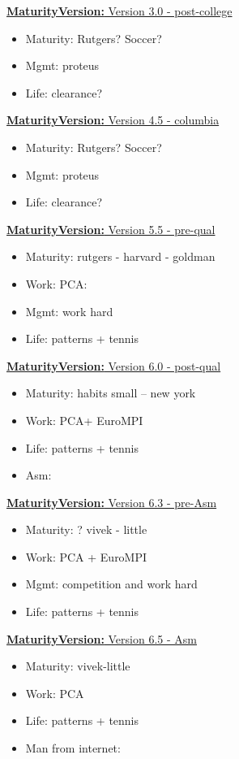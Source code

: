 \documentclass[11pt]{article}
\newcommand{\newMaturityVersion}[1]{\underline{\textbf{MaturityVersion:} #1} }
\begin{document}
\newMaturityVersion{Version 3.0 - post-college}
\begin{itemize} 
\item Maturity: Rutgers?  Soccer? 
\item Mgmt: proteus 
\item Life: clearance? 
\end{itemize} 

\newMaturityVersion{Version 4.5 - columbia} 
\begin{itemize} 
\item Maturity: Rutgers?  Soccer? 
\item Mgmt: proteus 
\item Life: clearance? 
\end{itemize} 


\newMaturityVersion{Version 5.5 - pre-qual} 
\begin{itemize} 
\item Maturity: rutgers - harvard - goldman 
\item Work: PCA: 
\item Mgmt: work hard 
\item Life: patterns + tennis
\end{itemize} 

\newMaturityVersion{Version 6.0 - post-qual}
\begin{itemize} 
\item Maturity: habits small – new york 
\item Work: PCA+ EuroMPI 
\item Life: patterns + tennis 
\item Asm: 
\end{itemize}

\newMaturityVersion{Version 6.3 - pre-Asm}
\begin{itemize} 
\item Maturity: ? vivek - little 
\item Work: PCA + EuroMPI 
\item Mgmt: competition and work hard 
\item Life: patterns + tennis 
\end{itemize}


\newMaturityVersion{Version 6.5 - Asm}
\begin{itemize} 
\item Maturity: vivek-little
\item Work: PCA 
\item Life: patterns + tennis 
\item Man from internet: 
\end{itemize} 
\end{document}
